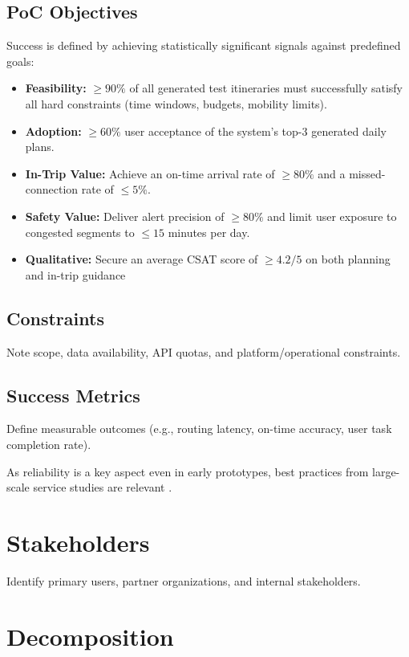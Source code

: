 \subsection{PoC Objectives}
Success is defined by achieving statistically significant signals against predefined goals: 
\begin{itemize}
    \item \textbf{Feasibility:} $\geq90\%$ of all generated test itineraries must successfully satisfy all hard constraints (time windows, budgets, mobility limits).
    \item \textbf{Adoption:} $\geq60\%$ user acceptance of the system’s top-3 generated daily plans.
    \item \textbf{In-Trip Value:} Achieve an on-time arrival rate of $\geq80\%$ and a missed-connection rate of $\leq5\%$.
    \item \textbf{Safety Value:} Deliver alert precision of $\geq80\%$ and limit user exposure to congested segments to $\leq15$ minutes per day.
    \item \textbf{Qualitative:} Secure an average CSAT score of $\geq4.2/5$ on both planning and in-trip guidance
\end{itemize}


\subsection{Constraints}
Note scope, data availability, API quotas, and platform/operational constraints.

\subsection{Success Metrics}
Define measurable outcomes (e.g., routing latency, on-time accuracy, user task completion rate).

As reliability is a key aspect even in early prototypes, best practices from large-scale service studies are relevant \cite{oppenheimer_why_2003}.

\section{Stakeholders}
Identify primary users, partner organizations, and internal stakeholders.

\section{Decomposition}

